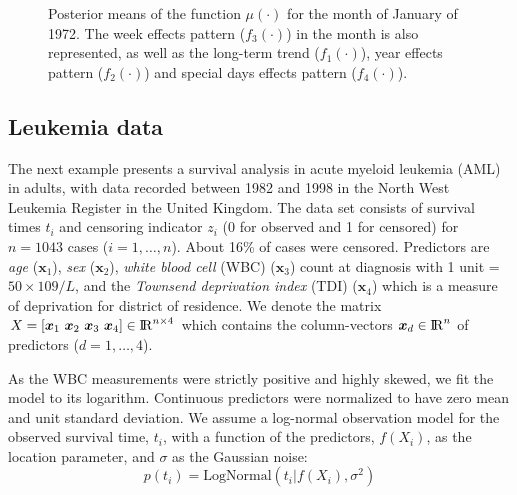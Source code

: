 \documentclass[onecolumn,a4paper,11pt]{article}
\begin{document}
\begin{figure}
\centering
{}
\caption{Posterior means of the function $\mu(\cdot)$ for the month of January of 1972. The week effects pattern ($f_3(\cdot)$) in the month is also represented, as well as the long-term trend ($f_1(\cdot)$), year effects pattern ($f_2(\cdot)$) and special days effects pattern ($f_4(\cdot)$). }
  \label{ch5_fig27_posteriors_onemonth_birthday}
\end{figure}

 
\subsection{Leukemia data}\label{ch5_sec_bf_caseVI}
The next example presents a survival analysis in acute myeloid leukemia (AML) in adults, with data recorded between 1982 and 1998 in the North West Leukemia Register in the United Kingdom. The data set consists of survival times $t_i$ and censoring indicator $z_i$ (0 for observed and 1 for censored) for $n=1043$ cases ($i=1,\dots,n$). About 16\% of cases were censored. Predictors are \textit{age} ($\bm{x}_1$), \textit{sex} ($\bm{x}_2$), \textit{white blood cell} (WBC) ($\bm{x}_3$) count at diagnosis with 1 unit = $50\times109/L$, and the \textit{Townsend deprivation index} (TDI) ($\bm{x}_4$) which is a measure of deprivation for district of residence. We denote the matrix $X=[\bm{x}_1\,\, \bm{x}_2\,\, \bm{x}_3\,\, \bm{x}_4] \in {\rm I\!R}^{n\times 4}$ which contains the column-vectors $\bm{x}_d \in {\rm I\!R}^n$ of predictors ($d=1,\dots,4$).

As the WBC measurements were strictly positive and highly skewed, we fit the model to its logarithm. Continuous predictors were normalized to have zero mean and unit standard deviation. %
We assume a log-normal observation model for the observed survival time, $t_i$, with a function of the predictors, $f(X_i)$, as the location parameter, and $\sigma$ as the Gaussian noise: 
%
\begin{equation*}
p(t_i)= \mathrm{LogNormal}(t_i|f(X_i),\sigma^2)
\end{equation*}
\end{document}
